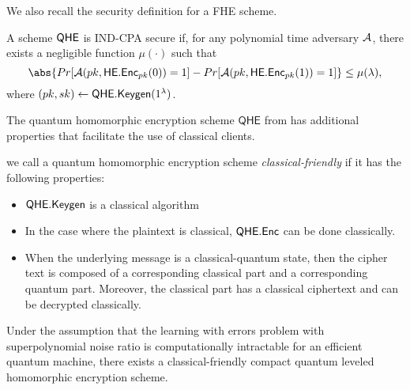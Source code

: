 We also recall the security definition for a FHE scheme.

\begin{definition}
    A scheme $\mathsf{QHE}$ is IND-CPA secure if, for any polynomial time adversary $\mathcal{A}$, there exists a negligible function $\mu(\cdot)$ such that
    $$\abs{Pr[\cA(pk, \mathsf{HE.Enc}_{pk}(0))=1]-Pr[\cA(pk, \mathsf{HE.Enc}_{pk}(1))=1]}\leq\mu(\lambda),$$
    where $(pk, sk)\leftarrow\mathsf{QHE.Keygen}(1^\lambda)$.
\end{definition}

The quantum homomorphic encryption scheme $\mathsf{QHE}$ from \cite{mahadev_qfhe} has additional properties that facilitate the use of classical clients.

\begin{definition} \label{def:classical-friendly}
    we call a quantum homomorphic encryption scheme \emph{classical-friendly} if it has the following properties:
    \begin{itemize}
        \item $\mathsf{QHE.Keygen}$ is a classical algorithm
        \item In the case where the plaintext is classical, $\mathsf{QHE.Enc}$ can be done classically.
        \item When the underlying message is a classical-quantum state, then the cipher text is composed of a corresponding classical part and a corresponding quantum part. Moreover, the classical part has a classical ciphertext and can be decrypted classically.
    \end{itemize}
\end{definition}

\begin{theorem} 
    Under the assumption that the learning with errors problem with superpolynomial noise ratio is computationally intractable for an efficient quantum machine,
    there exists a classical-friendly compact quantum leveled homomorphic encryption scheme.
\end{theorem}


